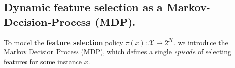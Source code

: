 


\subsection{Dynamic feature selection as a Markov-Decision-Process (MDP).}
To model the \textbf{feature selection} policy $\pi(x): \mathcal{X} \mapsto 2^\mathcal{H}$, we introduce the Markov Decision Process (MDP), which defines a single \emph{episode} of selecting features for some instance $x$.

